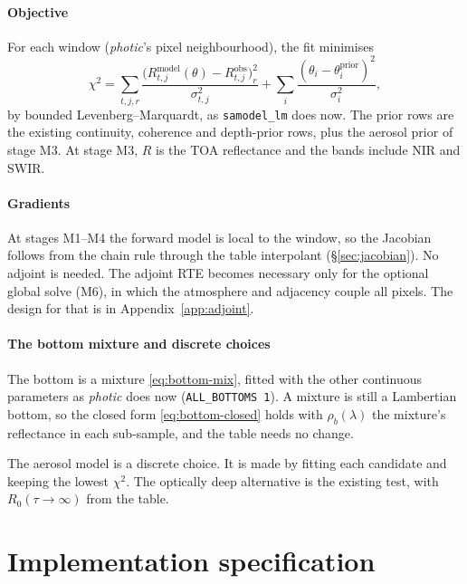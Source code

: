 \documentclass[11pt]{article}
\numberwithin{equation}{section}
\newcommand{\code}[1]{\texttt{#1}}
\begin{document}
\subsection{Objective}

For each window (\textit{photic}'s pixel neighbourhood), the fit minimises
\begin{equation}\label{eq:objective}
\chi^2 = \sum_{t,j,r}\frac{\big(R_{t,j}^{\mathrm{model}}(\theta) - R_{t,j}^{\mathrm{obs}}\big)_r^2}{\sigma_{t,j}^2}
 + \sum_i \frac{(\theta_i - \theta_i^{\mathrm{prior}})^2}{\sigma_i^2},
\end{equation}
by bounded Levenberg--Marquardt, as \code{samodel\_lm} does now. The prior rows are the existing
continuity, coherence and depth-prior rows, plus the aerosol prior of stage M3. At stage M3,
$R$ is the TOA reflectance and the bands include NIR and SWIR.

\subsection{Gradients}

At stages M1--M4 the forward model is local to the window, so the Jacobian follows from the
chain rule through the table interpolant (\S\ref{sec:jacobian}). No adjoint is needed. The
adjoint RTE becomes necessary only for the optional global solve (M6), in which the
atmosphere and adjacency couple all pixels. The design for that is in
Appendix~\ref{app:adjoint}.

\subsection{The bottom mixture and discrete choices}

The bottom is a mixture \eqref{eq:bottom-mix}, fitted with the other continuous parameters as
\textit{photic} does now (\code{ALL\_BOTTOMS 1}). A mixture is still a Lambertian bottom, so the
closed form \eqref{eq:bottom-closed} holds with $\rho_b(\lambda)$ the mixture's reflectance in
each sub-sample, and the table needs no change.

The aerosol model is a discrete choice. It is made by fitting each candidate and keeping the
lowest $\chi^2$. The optically deep alternative is the existing test, with
$R_0(\tau\to\infty)$ from the table.

\part{Implementation specification}
\end{document}
